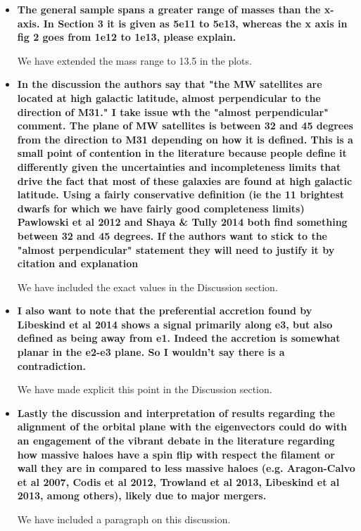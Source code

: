 \documentclass{article}
\begin{document}
\begin{itemize}
\item
{\bf The general sample spans a greater range of masses than the x-axis. In Section 3 it is given as 5e11 to 5e13, whereas the x axis in fig 2 goes from 1e12 to 1e13, please explain.}

We have extended the mass range to 13.5 in the plots.


\item
{\bf In the discussion the authors say that "the MW satellites are located at high galactic latitude, almost perpendicular to the direction of M31." I take issue wth the "almost perpendicular" comment. The plane of MW satellites is between 32 and 45 degrees from the direction to M31 depending on how it is defined. This is a small point of contention in the literature because people define it differently given the uncertainties and incompleteness limits that drive the fact that most of these galaxies are found at high galactic latitude. 
Using a fairly conservative definition (ie the 11 brightest dwarfs for which we have fairly good completeness limits) Pawlowski et al 2012 and Shaya \& Tully 2014 both find something between 32 and 45 degrees. If the authors want to stick to the "almost perpendicular" statement they will need to justify it by citation and explanation}


We have included the exact values in the Discussion section.

\item
{\bf I also want to note that the preferential accretion found by Libeskind et al 2014 shows a signal primarily along e3, but also defined as being away from e1. Indeed the accretion is somewhat planar in the e2-e3 plane. So I wouldn't say there is a contradiction.}

We have made explicit this point in the Discussion section.

\item
{\bf Lastly the discussion and interpretation of results regarding the alignment of the orbital plane with the eigenvectors could do with an engagement of the vibrant debate in the literature regarding how massive haloes have a spin flip with respect the filament or wall they are in compared to less massive haloes (e.g. Aragon-Calvo et al 2007, Codis et al 2012, Trowland et al 2013, Libeskind et al 2013, among others), likely due to major mergers.} 

We have included a paragraph on this discussion. 

\end{itemize}
\end{document}
